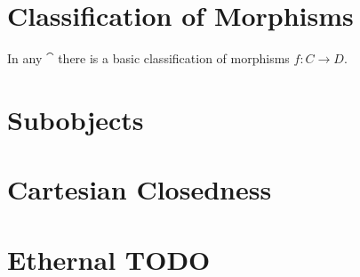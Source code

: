 \documentclass[a4paper,12pt,fleqn]{scrartcl}  %
\begin{document}
\begin{appendices}
\section{Classification of Morphisms}
	In any $\cat$ there is a basic classification of morphisms $f: C \rightarrow D$.\\
	

	

\section{Subobjects}


\section{Cartesian Closedness}



\section{Ethernal TODO}
	
	
	



\end{appendices}
			\nocite{*}
			
			
\end{document}
